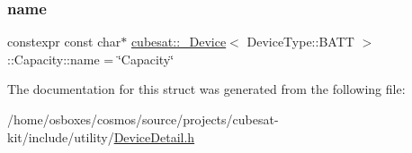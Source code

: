 \subsubsection{\texorpdfstring{name}{name}}
{\footnotesize\ttfamily constexpr const char$\ast$ \hyperlink{structcubesat_1_1__Device}{cubesat\+::\+\_\+\+Device}$<$ Device\+Type\+::\+B\+A\+TT $>$\+::Capacity\+::name = \char`\"{}Capacity\char`\"{}\hspace{0.3cm}{\ttfamily [static]}}



The documentation for this struct was generated from the following file\+:\begin{DoxyCompactItemize}
\item 
/home/osboxes/cosmos/source/projects/cubesat-\/kit/include/utility/\hyperlink{DeviceDetail_8h}{Device\+Detail.\+h}\end{DoxyCompactItemize}
